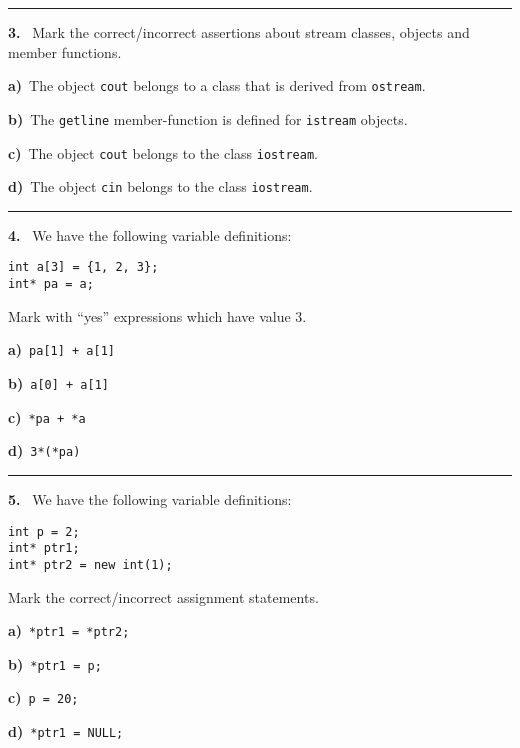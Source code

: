 \begin{multicols}{2}
\par\smallskip\hrule\par\medskip

{\bf 3. }\ Mark the correct/incorrect assertions about stream classes, objects and
member functions.

{\bf a)}\ The object \verb|cout| belongs to a class that is derived from \verb|ostream|.

{\bf b)}\ The \verb|getline| member-function is defined for \verb|istream| objects.

{\bf c)}\ The object \verb|cout| belongs to the class \verb|iostream|.

{\bf d)}\ The object \verb|cin| belongs to the class \verb|iostream|.

\par\smallskip\hrule\par\medskip

{\bf 4. }\ We have the following variable definitions:
 \vspace{-3mm}\begin{verbatim}
int a[3] = {1, 2, 3};
int* pa = a;
 \end{verbatim}\vspace{-6mm}
Mark with ``yes'' expressions which have value 3.

{\bf a)}\ \verb|pa[1] + a[1]|

{\bf b)}\ \verb|a[0] + a[1]|

{\bf c)}\ \verb|*pa + *a|

{\bf d)}\ \verb|3*(*pa)|

\par\smallskip\hrule\par\medskip

{\bf 5. }\ We have the following variable definitions:
 \vspace{-3mm}\begin{verbatim}
int p = 2;
int* ptr1;
int* ptr2 = new int(1);
 \end{verbatim}\vspace{-6mm}
Mark the correct/incorrect assignment statements.

{\bf a)}\ \verb|*ptr1 = *ptr2;|

{\bf b)}\ \verb|*ptr1 = p;|

{\bf c)}\ \verb|p = 20;|

{\bf d)}\ \verb|*ptr1 = NULL;|

\end{multicols}

